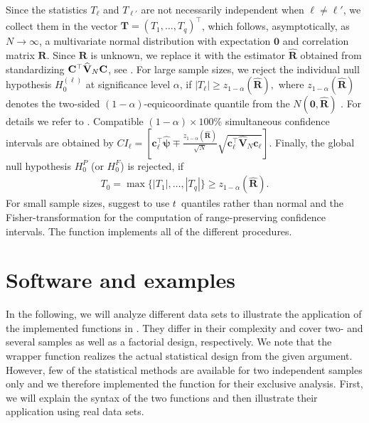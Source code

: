 Since the statistics $T_\ell$ and $T_{\ell'}$ are not necessarily independent 
when $\ell \not = \ell'$, we collect them in the vector $\mathbf{T} = (T_1, 
\ldots, T_q)^\top$, which follows, asymptotically, as $N\to \infty$, a 
multivariate normal distribution with expectation $\mathbf{0}$ and correlation 
matrix $\mathbf{R}$. Since $\mathbf{R}$ is unknown, we replace it with the estimator $\widehat{\mathbf{R}}$ obtained from standardizing $\mathbf{C}^\top 
\widehat{\mathbf{V}}_N \mathbf{C}$, see \cite{konietschke2012rank}. For large sample sizes, we reject the individual null 
hypothesis $H_0^{(\ell)}$ at significance level $\alpha$, if 
$
|T_\ell| \geq z_{1-\alpha}(\widehat{\mathbf{R}}),
$
where $z_{1-\alpha}(\widehat{\mathbf{R}})$ denotes the two-sided $(1 - 
\alpha)$-equicoordinate quantile from the $N(\mathbf{0}, \widehat{\mathbf{R}})$ \db. 
For details we refer to \cite{konietschke2012rank, umlauft2019wild}. Compatible 
$(1-\alpha)\times 100\%$ simultaneous confidence intervals are obtained by 
$CI_\ell = \left[ \mathbf{c}_\ell^\top\widehat{\bm{\psi}} \mp 
\frac{z_{1-\alpha}(\widehat{\mathbf{R}})}{\sqrt{N}}\sqrt{\mathbf{c}_\ell^\top 
\widehat{\mathbf{V}}_N \mathbf{c}_\ell} \right]$. Finally, the global null 
hypothesis $H_0^P$ (or $H_0^F$) is rejected, if 
\begin{eqnarray}
T_0= \max\{|T_1|,\ldots, |T_q|\} \geq z_{1-\alpha}(\widehat{\mathbf{R}}). \label{t0max}
\end{eqnarray}
For small sample sizes, \cite{konietschke2012rank} suggest to use $t$~quantiles 
rather than normal and the Fisher-transformation for the computation of 
range-preserving confidence intervals. The  function implements 
all of the different procedures.


\section{Software and examples} \label{sec: examples}

In the following, we will analyze different data sets to illustrate the 
application of the implemented functions in . They differ in their 
complexity and cover two- and several samples as well as a factorial design, 
respectively. We note that the wrapper function  realizes the 
actual statistical design from the given  argument. However, few 
of the statistical methods are available for two independent samples only and 
we therefore implemented the function  for their 
exclusive analysis. First, we will explain the syntax of the two functions and 
then illustrate their application using real data sets.

